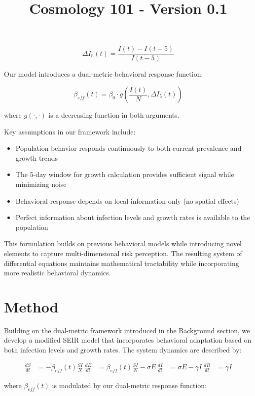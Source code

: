 \documentclass{article}\usepackage{graphicx} \usepackage{amsmath} \usepackage{colortbl}\title{Cosmology 101 - Version 0.1}
\begin{document}
\begin{equation}
\Delta I_5(t) = \frac{I(t) - I(t-5)}{I(t-5)}
\end{equation}

Our model introduces a dual-metric behavioral response function:

\begin{equation}
\beta_{eff}(t) = \beta_0 \cdot g\left(\frac{I(t)}{N}, \Delta I_5(t)\right)
\end{equation}

where $g(\cdot,\cdot)$ is a decreasing function in both arguments.

Key assumptions in our framework include:
\begin{itemize}
    \item Population behavior responds continuously to both current prevalence and growth trends
    \item The 5-day window for growth calculation provides sufficient signal while minimizing noise
    \item Behavioral response depends on local information only (no spatial effects)
    \item Perfect information about infection levels and growth rates is available to the population
\end{itemize}

This formulation builds on previous behavioral models \cite{funk2009spread} while introducing novel elements to capture multi-dimensional risk perception. The resulting system of differential equations maintains mathematical tractability while incorporating more realistic behavioral dynamics.\section{Method}
Building on the dual-metric framework introduced in the Background section, we develop a modified SEIR model that incorporates behavioral adaptation based on both infection levels and growth rates. The system dynamics are described by:

\begin{equation}
\begin{aligned}
\frac{dS}{dt} &= -\beta_{eff}(t)\frac{SI}{N} \
\frac{dE}{dt} &= \beta_{eff}(t)\frac{SI}{N} - \sigma E \
\frac{dI}{dt} &= \sigma E - \gamma I \
\frac{dR}{dt} &= \gamma I
\end{aligned}
\end{equation}

where $\beta_{eff}(t)$ is modulated by our dual-metric response function:
\end{document}

